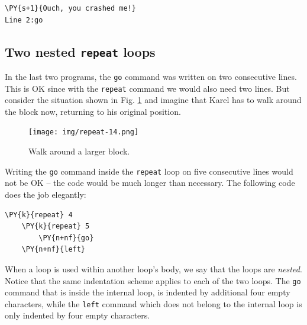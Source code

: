 \begin{ybox}
\begin{Verbatim}[commandchars=\\\{\}]
\PY{s+1}{Ouch, you crashed me!}
Line 2:go
\end{Verbatim}
\end{ybox}
\vspace{6mm}


\subsection{Two nested {\tt repeat} loops}

In the last two programs, the {\tt go} command was written on two
consecutive lines. This is 
OK since with the {\tt repeat} command we would also need two lines. 
But consider the situation shown in Fig. \ref{fig:repeat-14} and imagine
that Karel has to walk around the block now, returning to his original 
position.
\newpage

\begin{figure}[!ht]
\begin{center}
\texttt{[image: img/repeat-14.png]}
\vspace{-0mm}
\caption{Walk around a larger block.}
\label{fig:repeat-14}
\end{center}
\end{figure}
\noindent
Writing the {\tt go} command inside the {\tt repeat} loop on five consecutive lines
would not be OK -- the code would be much longer than necessary. The following 
code does the job elegantly:\\

\begin{bbox}
\begin{Verbatim}[commandchars=\\\{\}]
\PY{k}{repeat} 4
    \PY{k}{repeat} 5
        \PY{n+nf}{go}
    \PY{n+nf}{left}
\end{Verbatim}
\end{bbox}
\vspace{6mm}

\noindent
When a loop is used within another loop's body, we say that the loops are {\em nested}.
Notice that the same indentation scheme applies to each of the two loops. The {\tt go}
command that is inside the internal loop, is indented by additional four empty characters, while 
the {\tt left} command which does not belong to the internal loop is only indented 
by four empty characters.  

